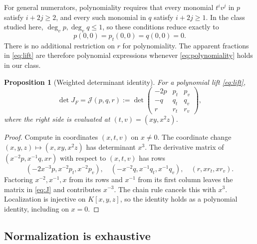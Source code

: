 \documentclass[11pt,a4paper]{article}
\numberwithin{equation}{section}
\newtheorem{proposition}[theorem]{Proposition}
\theoremstyle{definition}
\theoremstyle{remark}
\newcommand{\J}{\mathcal{J}}
\begin{document}
For general numerators, polynomiality requires that every monomial $t^iv^j$
in $p$ satisfy $i+2j\ge2$, and every such monomial in $q$ satisfy
$i+2j\ge1$. In the class studied here, $\deg_vp,\deg_vq\le1$, so these
conditions reduce exactly to
\begin{equation}\label{eq:polynomiality}
p(0,0)=p_t(0,0)=q(0,0)=0.
\end{equation}
There is no additional restriction on $r$ for polynomiality. The apparent
fractions in \eqref{eq:lift} are therefore polynomial expressions whenever
\eqref{eq:polynomiality} holds in our class.

\begin{proposition}[Weighted determinant identity]\label{prop:jacobian}
For a polynomial lift \eqref{eq:lift},
\begin{equation}\label{eq:J}
\det J_F=\J(p,q,r):=
\det\begin{pmatrix}
-2p&p_t&p_v\\
-q&q_t&q_v\\
r&r_t&r_v
\end{pmatrix},
\end{equation}
where the right side is evaluated at $(t,v)=(xy,x^2z)$.
\end{proposition}
\begin{proof}
Compute in coordinates $(x,t,v)$ on $x\ne0$. The coordinate change
$(x,y,z)\mapsto(x,xy,x^2z)$ has determinant $x^3$. The derivative matrix of
$(x^{-2}p,x^{-1}q,xr)$ with respect to $(x,t,v)$ has rows
\[
(-2x^{-3}p,x^{-2}p_t,x^{-2}p_v),\quad
(-x^{-2}q,x^{-1}q_t,x^{-1}q_v),\quad
(r,xr_t,xr_v).
\]
Factoring $x^{-2},x^{-1},x$ from its rows and $x^{-1}$ from its first column
leaves the matrix in \eqref{eq:J} and contributes $x^{-3}$. The chain rule
cancels this with $x^3$. Localization is injective on $K[x,y,z]$, so the
identity holds as a polynomial identity, including on $x=0$.
\end{proof}

\subsection{Normalization is exhaustive}
\end{document}
